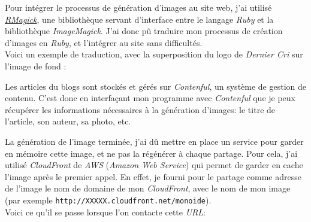 \bigskip

Pour intégrer le processus de génération d'images au site web, j'ai
utilisé \href{https://github.com/rmagick/rmagick}{\emph{RMagick}}, une
bibliothèque servant d'interface entre le langage \emph{Ruby} et la
bibliothèque \emph{ImageMagick}. J'ai donc pû traduire mon processus de
création d'images en \emph{Ruby}, et l'intégrer au site sans
difficultés.\\
Voici un exemple de traduction, avec la superposition du logo de
\emph{Dernier Cri} sur l'image de fond :

\begin{Shaded}
\begin{Highlighting}[]
 \NormalTok{\textbackslash{}}
  \DataTypeTok{\textbackslash{}(}  \DataTypeTok{\textbackslash{})} \NormalTok{\textbackslash{}}
\end{Highlighting}
\end{Shaded}

\begin{Shaded}
\begin{Highlighting}[]
 
  \NormalTok{::}

    \NormalTok{::}\NormalTok{,}
    \NormalTok{,}
    \NormalTok{,}
    \NormalTok{::}
  \NormalTok{)}
\end{Highlighting}
\end{Shaded}

\bigskip

Les articles du blogs sont stockés et gérés sur \emph{Contenful}, un
système de gestion de contenu. C'est donc en interfaçant mon programme
avec \emph{Contenful} que je peux récupérer les informations nécessaires
à la génération d'images: le titre de l'article, son auteur, sa photo,
etc.

\bigskip

La génération de l'image terminée, j'ai dû mettre en place un service
pour garder en mémoire cette image, et ne pas la régénérer à chaque
partage. Pour cela, j'ai utilisé \emph{CloudFront} de \emph{AWS}
(\emph{Amazon Web Service}) qui permet de garder en cache l'image après
le premier appel. En effet, je fourni pour le partage comme adresse de
l'image le nom de domaine de mon \emph{CloudFront}, avec le nom de mon
image (par exemple \texttt{http://XXXXX.cloudfront.net/monoide}).\\
Voici ce qu'il se passe lorsque l'on contacte cette \emph{URL}:

